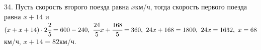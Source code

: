 34. Пусть скорость второго поезда равна $x$км/ч, тогда скорость первого поезда равна $x+14$ и $(x+x+14)\cdot2\cfrac{2}{5}=600-240,\ \cfrac{24}{5}x+\cfrac{168}{5}=360,\ 24x+168=1800,\ 24x=1632,\ x=68$км/ч, $x+14=82$км/ч.\\
